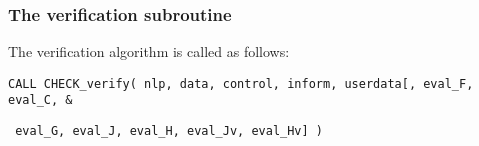 \documentclass{galahad}
\newcommand{\packagename}{CHECK}
\begin{document}

\subsubsection{The verification  subroutine}
The verification algorithm is called as follows:
\vspace*{1mm}

\hspace{8mm}
{\tt CALL \packagename\_verify( nlp, data, control, inform, userdata[, eval\_F, 
eval\_C, \hspace{4mm}                  \&}
\vspace*{-1mm}

\hspace{41.5mm}
{\tt                        
eval\_G, eval\_J, eval\_H, eval\_Jv, eval\_Hv] )}
\end{document}
